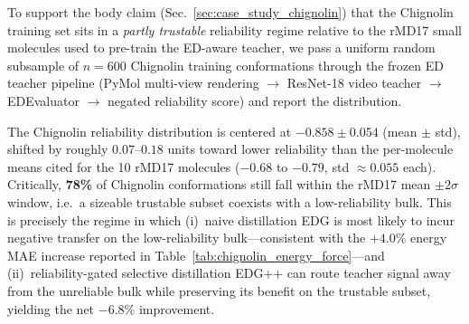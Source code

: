 To support the body claim (Sec.~\ref{sec:case_study_chignolin}) that the Chignolin training set sits in a \emph{partly trustable} reliability regime relative to the rMD17 small molecules used to pre-train the ED-aware teacher, we pass a uniform random subsample of $n\!=\!600$ Chignolin training conformations through the frozen ED teacher pipeline (PyMol multi-view rendering $\to$ ResNet-18 video teacher $\to$ EDEvaluator $\to$ negated reliability score) and report the distribution.

The Chignolin reliability distribution is centered at \textbf{$-0.858 \pm 0.054$} (mean $\pm$ std), shifted by roughly $0.07$--$0.18$ units toward lower reliability than the per-molecule means cited for the 10 rMD17 molecules ($-0.68$ to $-0.79$, std $\approx\!0.055$ each). Critically, \textbf{78\%} of Chignolin conformations still fall within the rMD17 mean $\pm 2\sigma$ window, i.e.\ a sizeable trustable subset coexists with a low-reliability bulk. This is precisely the regime in which (i)~naive distillation EDG is most likely to incur negative transfer on the low-reliability bulk---consistent with the $+\!4.0\%$ energy MAE increase reported in Table~\ref{tab:chignolin_energy_force}---and (ii)~reliability-gated selective distillation EDG++ can route teacher signal away from the unreliable bulk while preserving its benefit on the trustable subset, yielding the net $-\!6.8\%$ improvement.

